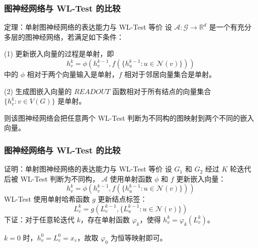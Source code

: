 \documentclass{beamer}
\begin{document}
\begin{frame}

  \frametitle{图神经网络与 WL-Test 的比较}
  \begin{block}{定理：单射图神经网络的表达能力与 WL-Test 等价}
    设 $\mathcal{A}: \mathcal{G} \rightarrow \mathbb{R}^d$ 是一个有充分多层的图神经网络，若满足如下条件：

    (1) 更新嵌入向量的过程是单射，即
    $$ h_v^k = \phi(h_v^{k-1}, f(\{h_u^{k-1} : u \in \mathcal{N}(v)\})) $$
    中的 $\phi$ 相对于两个向量输入是单射，$f$ 相对于邻居向量集合是单射。

    (2) 生成图嵌入向量的 $READOUT$ 函数相对于所有结点的向量集合 $\{h_v^k : v \in V(G)\}$ 是单射。

    则该图神经网络会把任意两个 WL-Test 判断为不同构的图映射到两个不同的嵌入向量。

  \end{block}

\end{frame}

\begin{frame}

  \frametitle{图神经网络与 WL-Test 的比较}
  \begin{block}{证明：单射图神经网络的表达能力与 WL-Test 等价}
    设 $G_1$ 和 $G_2$ 经过 $K$ 轮迭代后被 WL-Test 判断为不同构，
    $\mathcal{A}$ 使用单射函数 $\phi$ 和 $f$ 更新嵌入向量：
    $$ h_v^k = \phi(h_v^{k-1}, f(\{h_u^{k-1} : u \in \mathcal{N}(v)\})) $$
    WL-Test 使用单射哈希函数 $g$ 更新结点标签：
    $$ L_v^k = g(L_v^{k-1}, \{L_u^{k-1} : u \in \mathcal{N}(v)\}) $$
    下证：对于任意轮迭代 $k$，存在单射函数 $\varphi_k$，使得 $h_v^k = \varphi_k(L_v^k)$。

    $k = 0$ 时，$h_v^0 = L_v^0 = x_v$，故取 $\varphi_0$ 为恒等映射即可。

  \end{block}

\end{frame}
\end{document}
